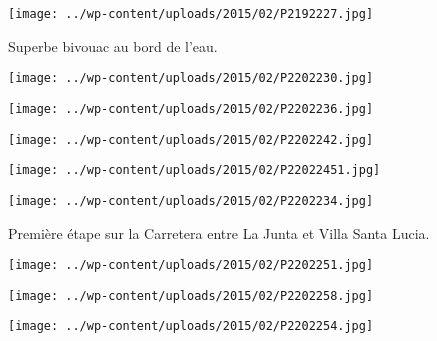  

\begin{center} \texttt{[image: ../wp-content/uploads/2015/02/P2192227.jpg]} \end{center}

 

 Superbe bivouac au bord de l'eau.

\begin{center} \texttt{[image: ../wp-content/uploads/2015/02/P2202230.jpg]} \end{center}



 

\begin{center} \texttt{[image: ../wp-content/uploads/2015/02/P2202236.jpg]} \end{center}

 

\begin{center} \texttt{[image: ../wp-content/uploads/2015/02/P2202242.jpg]} \end{center}



\begin{center} \texttt{[image: ../wp-content/uploads/2015/02/P22022451.jpg]} \end{center}

 

\begin{center} \texttt{[image: ../wp-content/uploads/2015/02/P2202234.jpg]} \end{center}

Première étape sur la Carretera entre La Junta et Villa Santa Lucia.

 

\begin{center} \texttt{[image: ../wp-content/uploads/2015/02/P2202251.jpg]} \end{center}



\begin{center} \texttt{[image: ../wp-content/uploads/2015/02/P2202258.jpg]} \end{center}



\begin{center} \texttt{[image: ../wp-content/uploads/2015/02/P2202254.jpg]} \end{center}

